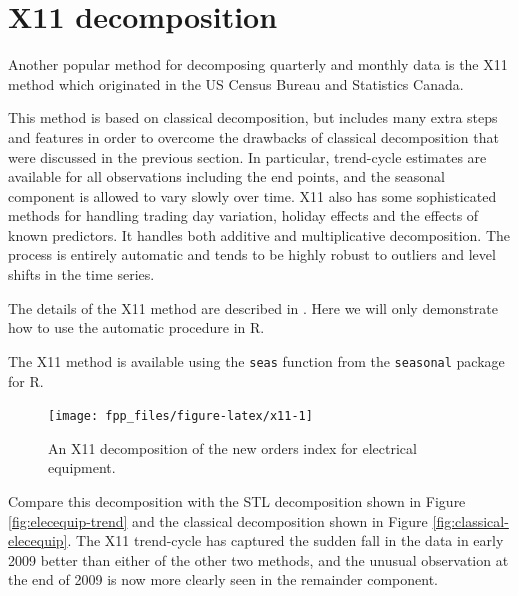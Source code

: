 \documentclass[]{book}
\newenvironment{Shaded}{\begin{snugshade}}{\end{snugshade}}
\newcommand{\DataTypeTok}[1]{\textcolor[rgb]{0.13,0.29,0.53}{#1}}
\newcommand{\KeywordTok}[1]{\textcolor[rgb]{0.13,0.29,0.53}{\textbf{#1}}}
\newcommand{\NormalTok}[1]{#1}
\newcommand{\OperatorTok}[1]{\textcolor[rgb]{0.81,0.36,0.00}{\textbf{#1}}}
\newcommand{\StringTok}[1]{\textcolor[rgb]{0.31,0.60,0.02}{#1}}
\begin{document}
\hypertarget{x11-decomposition}{%
\section{X11 decomposition}\label{x11-decomposition}}

Another popular method for decomposing quarterly and monthly data is the X11 method which originated in the US Census Bureau and Statistics Canada.

This method is based on classical decomposition, but includes many extra steps and features in order to overcome the drawbacks of classical decomposition that were discussed in the previous section. In particular, trend-cycle estimates are available for all observations including the end points, and the seasonal component is allowed to vary slowly over time. X11 also has some sophisticated methods for handling trading day variation, holiday effects and the effects of known predictors. It handles both additive and multiplicative decomposition. The process is entirely automatic and tends to be highly robust to outliers and level shifts in the time series.

The details of the X11 method are described in \citet{Dagum2016}. Here we will only demonstrate how to use the automatic procedure in R.

The X11 method is available using the \texttt{seas} function from the \texttt{seasonal} package for R.

\begin{Shaded}
\end{Shaded}

\begin{figure}

{\centering \texttt{[image: fpp\_files/figure-latex/x11-1]} 

}

\caption{An X11 decomposition of the new orders index for electrical equipment.}\label{fig:x11}
\end{figure}

Compare this decomposition with the STL decomposition shown in Figure \ref{fig:elecequip-trend} and the classical decomposition shown in Figure \ref{fig:classical-elecequip}. The X11 trend-cycle has captured the sudden fall in the data in early 2009 better than either of the other two methods, and the unusual observation at the end of 2009 is now more clearly seen in the remainder component.
\end{document}
